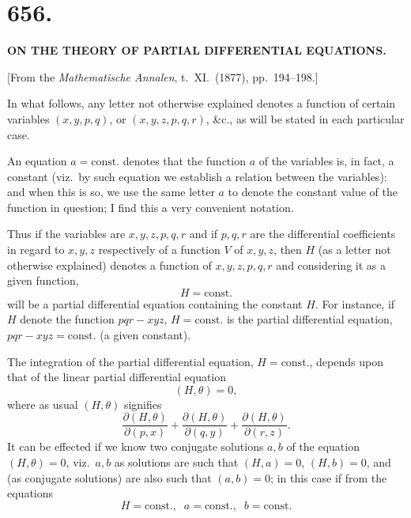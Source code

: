 \documentclass[11pt,a4paper]{article}
\begin{document}
\newpage


\section*{656.}

\begin{center}
\textbf{ON THE THEORY OF PARTIAL DIFFERENTIAL EQUATIONS.}
\end{center}

\medskip

\begin{center}
[From the \emph{Mathematische Annalen}, t.~XI.\ (1877), pp.~194--198.]
\end{center}

\medskip

In what follows, any letter not otherwise explained denotes a function of certain variables $(x, y, p, q)$, or $(x, y, z, p, q, r)$, \&c., as will be stated in each particular case.

An equation $a = \text{const.}$ denotes that the function $a$ of the variables is, in fact, a constant (viz.\ by such equation we establish a relation between the variables): and when this is so, we use the same letter $a$ to denote the constant value of the function in question; I find this a very convenient notation.

Thus if the variables are $x, y, z, p, q, r$ and if $p, q, r$ are the differential coefficients in regard to $x, y, z$ respectively of a function $V$ of $x, y, z$, then $H$ (as a letter not otherwise explained) denotes a function of $x, y, z, p, q, r$ and considering it as a given function,
\[
H = \text{const.}
\]
will be a partial differential equation containing the constant $H$. For instance, if $H$ denote the function $pqr - xyz$, $H = \text{const.}$ is the partial differential equation, $pqr - xyz = \text{const.}$ (a given constant).

The integration of the partial differential equation, $H = \text{const.}$, depends upon that of the linear partial differential equation
\[
(H, \theta) = 0,
\]
where as usual $(H, \theta)$ signifies
\[
\frac{\partial(H, \theta)}{\partial(p, x)} + \frac{\partial(H, \theta)}{\partial(q, y)} + \frac{\partial(H, \theta)}{\partial(r, z)}.
\]
It can be effected if we know two conjugate solutions $a, b$ of the equation $(H, \theta) = 0$, viz.\ $a, b$ as solutions are such that $(H, a) = 0$, $(H, b) = 0$, and (as conjugate solutions) are also such that $(a, b) = 0$; in this case if from the equations
\[
H = \text{const.}, \;\; a = \text{const.}, \;\; b = \text{const.}
\]
\end{document}
